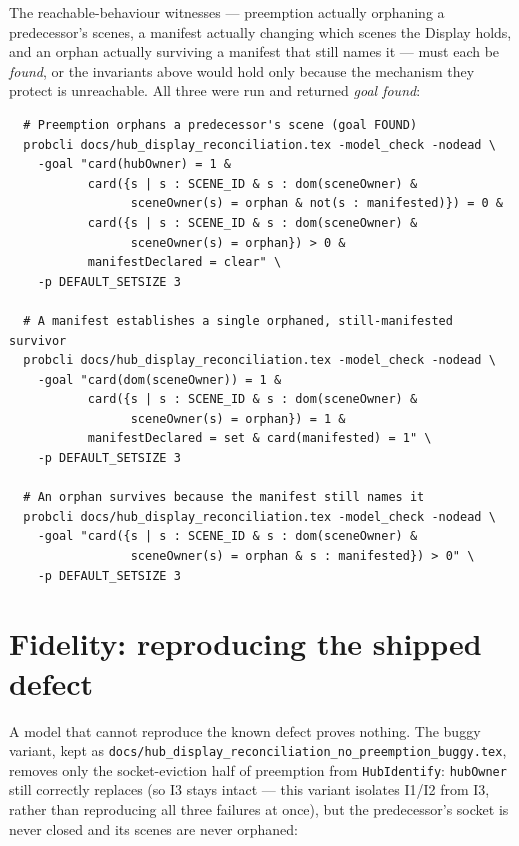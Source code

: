 \documentclass[a4paper,10pt,fleqn]{article}
\begin{document}
The reachable-behaviour witnesses --- preemption actually orphaning a
predecessor's scenes, a manifest actually changing which scenes the
Display holds, and an orphan actually surviving a manifest that still
names it --- must each be \emph{found}, or the invariants above would
hold only because the mechanism they protect is unreachable.  All three
were run and returned \emph{goal found}:
\begin{verbatim}
  # Preemption orphans a predecessor's scene (goal FOUND)
  probcli docs/hub_display_reconciliation.tex -model_check -nodead \
    -goal "card(hubOwner) = 1 &
           card({s | s : SCENE_ID & s : dom(sceneOwner) &
                 sceneOwner(s) = orphan & not(s : manifested)}) = 0 &
           card({s | s : SCENE_ID & s : dom(sceneOwner) &
                 sceneOwner(s) = orphan}) > 0 &
           manifestDeclared = clear" \
    -p DEFAULT_SETSIZE 3

  # A manifest establishes a single orphaned, still-manifested survivor
  probcli docs/hub_display_reconciliation.tex -model_check -nodead \
    -goal "card(dom(sceneOwner)) = 1 &
           card({s | s : SCENE_ID & s : dom(sceneOwner) &
                 sceneOwner(s) = orphan}) = 1 &
           manifestDeclared = set & card(manifested) = 1" \
    -p DEFAULT_SETSIZE 3

  # An orphan survives because the manifest still names it
  probcli docs/hub_display_reconciliation.tex -model_check -nodead \
    -goal "card({s | s : SCENE_ID & s : dom(sceneOwner) &
                 sceneOwner(s) = orphan & s : manifested}) > 0" \
    -p DEFAULT_SETSIZE 3
\end{verbatim}

\section{Fidelity: reproducing the shipped defect}
\label{sec:fidelity}

A model that cannot reproduce the known defect proves nothing.  The buggy
variant, kept as
\texttt{docs/hub\_display\_reconciliation\_no\_preemption\_buggy.tex},
removes only the socket-eviction half of preemption from
\texttt{HubIdentify}: \texttt{hubOwner} still correctly replaces (so I3
stays intact --- this variant isolates I1/I2 from I3, rather than
reproducing all three failures at once), but the predecessor's socket is
never closed and its scenes are never orphaned:
\end{document}
